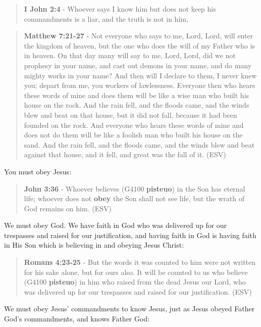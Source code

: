 \documentclass[11pt]{article}
\begin{document}
\begin{quote}
\textbf{I John 2:4} - Whoever says I know him but does not keep his commandments is a liar, and the truth is not in him,
\end{quote}

\begin{quote}
\textbf{Matthew 7:21-27} - Not everyone who says to me, Lord, Lord, will enter the kingdom of heaven, but the one who does the will of my Father who is in heaven.  On that day many will say to me, Lord, Lord, did we not prophesy in your name, and cast out demons in your name, and do many mighty works in your name?  And then will I declare to them, I never knew you; depart from me, you workers of lawlessness.  Everyone then who hears these words of mine and does them will be like a wise man who built his house on the rock.  And the rain fell, and the floods came, and the winds blew and beat on that house, but it did not fall, because it had been founded on the rock.  And everyone who hears these words of mine and does not do them will be like a foolish man who built his house on the sand.  And the rain fell, and the floods came, and the winds blew and beat against that house, and it fell, and great was the fall of it. (ESV)
\end{quote}

You must obey Jesus:

\begin{quote}
\textbf{John 3:36} - Whoever believes (G4100 \textbf{pisteuo}) in the Son has eternal life; whoever does not \textbf{obey} the Son shall not see life, but the wrath of God remains on him. (ESV)
\end{quote}

We must obey God. We have faith in God who was delivered up for our trespasses and raised for our justification, and having faith in God is having faith in His Son which is believing in and obeying Jesus Christ:

\begin{quote}
\textbf{Romans 4:23-25} - But the words it was counted to him were not written for his sake alone, but for ours also. It will be counted to us who believe (G4100 \textbf{pisteuo}) in him who raised from the dead Jesus our Lord, who was delivered up for our trespasses and raised for our justification. (ESV)
\end{quote}

We must obey Jesus' commandments to know Jesus, just as Jesus obeyed Father God's commandments, and knows Father God:
\end{document}
